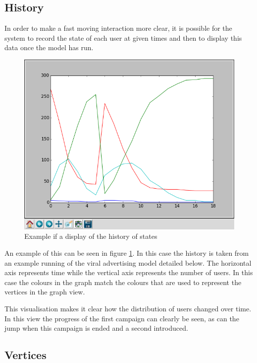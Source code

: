 \documentclass[12pt,a4paper]{article}
\begin{document}
\subsection{History}

In order to make a fast moving interaction more clear, it is possible for the system to record the state of each user at given times and then to display this data once the model has run.

\begin{figure}[htb]
\caption{Example if a display of the history of states}
\label{fig:history}
\centering
\includegraphics[scale=0.3]{Graph.png}
\end{figure}

An example of this can be seen in figure \ref{fig:history}. In this case the history is taken from an example running of the viral advertising model detailed below. The horizontal axis represents time while the vertical axis represents the number of users. In this case the colours in the graph match the colours that are used to represent the vertices in the graph view.

This visualisation makes it clear how the distribution of users changed over time. In this view the progress of the first campaign can clearly be seen, as can the jump when this campaign is ended and a second introduced.

\subsection{Vertices}
\end{document}
